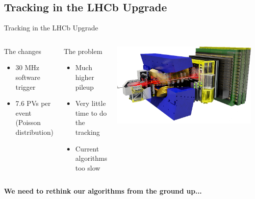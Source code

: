 \subsection{Tracking in the LHCb Upgrade}
\begin{frame}{Tracking in the LHCb Upgrade}
  \begin{columns}[c]
    \begin{block}{The changes}
      \begin{itemize}
          \item 30 MHz software trigger
          \item 7.6 PVs per event (Poisson distribution)
      \end{itemize}
    \end{block}
    \begin{block}{The problem}
    \begin{itemize}
    	\item Much higher pileup
    	\item Very little time to do the tracking
    	\item Current algorithms too slow
    \end{itemize}
    \end{block}
      \begin{center}
    \includegraphics[width=\textwidth, trim=18 0 18 0]{images/LHCbDet.png}
  \end{center}
  \end{columns}

  \vspace{1em}
  \begin{center}
    \textbf{We need to rethink our algorithms from the ground up...}
  \end{center}
\end{frame}

